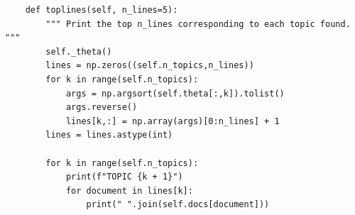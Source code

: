 \begin{lstlisting}
    def toplines(self, n_lines=5):
        """ Print the top n_lines corresponding to each topic found. """
        self._theta()
        lines = np.zeros((self.n_topics,n_lines))
        for k in range(self.n_topics):
            args = np.argsort(self.theta[:,k]).tolist()
            args.reverse()
            lines[k,:] = np.array(args)[0:n_lines] + 1
        lines = lines.astype(int)

        for k in range(self.n_topics):
            print(f"TOPIC {k + 1}")
            for document in lines[k]:
                print(" ".join(self.docs[document]))

\end{lstlisting}
